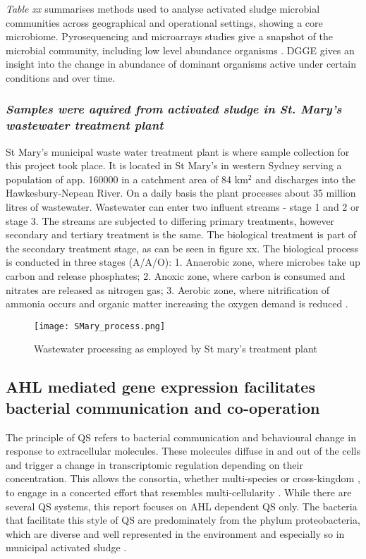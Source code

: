 \documentclass[11pt]{article}
\begin{document}
\emph{Table xx} summarises methods used to analyse activated sludge microbial communities across geographical and operational settings, showing a core microbiome. Pyrosequencing and microarrays studies give a snapshot of the microbial community, including low level abundance organisms \cite{ranasinghe2012revealing}. DGGE gives an insight into the change in abundance of dominant organisms active under certain conditions and over time. 

\subsubsection{\emph{Samples were aquired from activated sludge in St. Mary's wastewater treatment plant}}
St Mary's municipal waste water treatment plant is where sample collection for this project took place. It is located in St Mary's in western Sydney serving a population of app. 160000 in a catchment area of 84 km$^{2}$ and discharges into the Hawkesbury-Nepean River. On a daily basis the plant processes about 35 million litres of wastewater. Wastewater can enter two influent streams - stage 1 and 2 or stage 3. The streams are subjected to differing primary treatments, however secondary and tertiary treatment is the same. The biological treatment is part of the secondary treatment stage, as can be seen in figure xx. The biological process is conducted in three stages (A/A/O): 1. Anaerobic zone, where microbes take up carbon and release phosphates; 2. Anoxic zone, where carbon is consumed and nitrates are released as nitrogen gas; 3. Aerobic zone, where nitrification of ammonia occurs and organic matter increasing the oxygen demand is reduced \cite{stmarys}.
\begin{figure}
\texttt{[image: SMary\_process.png]}
\caption{Wastewater processing as employed by St mary's treatment plant \cite{stmarys}}
\end{figure}

\subsection{AHL mediated gene expression facilitates bacterial communication and co-operation}
The principle of QS refers to bacterial communication and behavioural change in response to extracellular molecules. These molecules diffuse in and out of the cells and trigger a change in transcriptomic regulation depending on their concentration. This allows the consortia, whether multi-species or cross-kingdom \citep{williams2007quorum}, to engage in a concerted effort that resembles multi-cellularity \cite{kjelleberg2002}. While there are several QS systems, this report focuses on AHL dependent QS only. The bacteria that facilitate this style of QS are predominately from the phylum proteobacteria, which are diverse and well represented in the environment and especially so in municipal activated sludge \cite{Hesham_11,Wagner_02}.  
\end{document}
